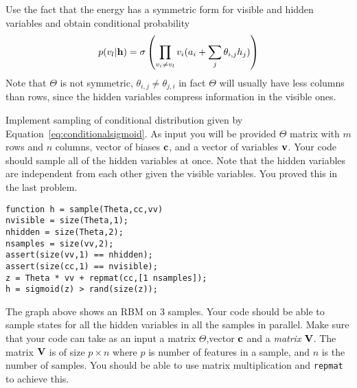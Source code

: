 \documentclass{article}
\begin{document}
Use the fact that the energy has a symmetric form for visible and hidden variables and obtain conditional probability
\[
p(v_l | \mathbf{h}) = \sigma\left(\prod_{v_i \neq v_l}v_i(a_i + \sum_j \theta_{i,j}h_j)\right)
\]
Note that $\Theta$ is not symmetric, $\theta_{i,j} \neq \theta_{j,i}$ in fact $\Theta$ will usually have less columns than rows, since the hidden variables compress information in the visible ones.

\newproblem{2pt}

Implement sampling of conditional distribution given by Equation~\ref{eq:conditionalsigmoid}.
As input you will be provided $\Theta$ matrix with $m$ rows and $n$ columns, vector of biases $\mathbf{c}$, and a vector of variables $\mathbf{v}$.
Your code should sample all of the hidden variables at once. Note that the hidden variables are independent from each other given the visible variables. You proved this in the last problem.
\begin{verbatim}
function h = sample(Theta,cc,vv)
nvisible = size(Theta,1);
nhidden = size(Theta,2);
nsamples = size(vv,2);
assert(size(vv,1) == nhidden); 
assert(size(cc,1) == nvisible);
z = Theta * vv + repmat(cc,[1 nsamples]);
h = sigmoid(z) > rand(size(z));
\end{verbatim}



\begin{center}


\end{center}

The graph above shows an RBM on 3 samples. Your code should be able to sample states for all the hidden variables in all the samples in parallel.
Make sure that your code can take as an input a matrix $\Theta$,vector $\mathbf{c}$ and a {\em matrix} $\mathbf{V}$. The matrix $\mathbf{V}$ is of size $p \times n$ where
$p$ is number of features in a sample, and $n$ is the number of samples. You should be able to use matrix multiplication and \verb|repmat| to achieve this.
\end{document}
